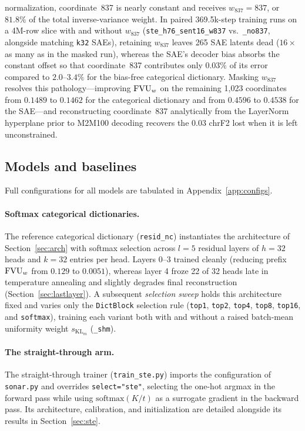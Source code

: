 normalization, coordinate~837 is nearly constant and receives
$w_{837} = 837$, or $81.8\%$ of the total inverse-variance weight. In
paired 369.5k-step training runs on a 4M-row slice with and without
$w_{837}$ (\texttt{ste\_h76\_sent16\_w837} vs.\ \texttt{\_no837}, alongside
matching \texttt{k32} SAEs), retaining $w_{837}$ leaves 265 SAE latents
dead ($16\times$ as many as in the masked run), whereas the SAE's decoder
bias absorbs the constant offset so that coordinate~837 contributes only
$0.03\%$ of its error compared to $2.0$--$3.4\%$ for the bias-free
categorical dictionary. Masking $w_{837}$ resolves this
pathology---improving $\mathrm{FVU}_w$ on the remaining 1{,}023 coordinates from
$0.1489$ to $0.1462$ for the categorical dictionary and from $0.4596$ to
$0.4538$ for the SAE---and reconstructing
coordinate~837 analytically from the LayerNorm hyperplane prior to M2M100
decoding recovers the $0.03$ chrF2 lost when it is left unconstrained.

\subsection{Models and baselines}
\label{sec:models}

Full configurations for all models are tabulated in
Appendix~\ref{app:configs}.

\paragraph{Softmax categorical dictionaries.}
The reference categorical dictionary (\texttt{resid\_nc}) instantiates the
architecture of Section~\ref{sec:arch} with softmax selection across
$l{=}5$ residual layers of $h{=}32$ heads and $k{=}32$ entries per head.
Layers 0--3 trained cleanly (reducing prefix $\mathrm{FVU}_w$ from $0.129$ to
$0.0051$), whereas layer 4 froze 22 of 32 heads late in temperature
annealing and slightly degrades final reconstruction
(Section~\ref{sec:lastlayer}). A subsequent \emph{selection sweep} holds
this architecture fixed and varies only the \texttt{DictBlock} selection
rule (\texttt{top1}, \texttt{top2}, \texttt{top4}, \texttt{top8},
\texttt{top16}, and \texttt{softmax}), training each variant both with and
without a raised batch-mean uniformity weight $s_{\mathrm{KL}_m}$
(\texttt{\_shm}).

\paragraph{The straight-through arm.}
The straight-through trainer (\texttt{train\_ste.py}) imports the
configuration of \texttt{sonar.py} and overrides \texttt{select="ste"},
selecting the one-hot argmax in the forward pass while using
$\mathrm{softmax}(K/t)$ as a surrogate gradient in the backward pass. Its
architecture, calibration, and initialization are detailed alongside its
results in Section~\ref{sec:ste}.

